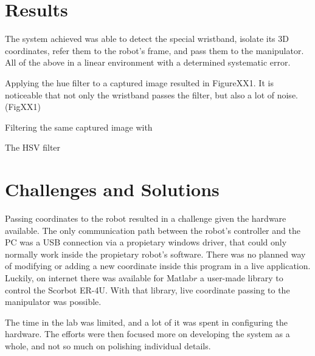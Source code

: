 \documentclass[12pt,a4paper,titlepage]{article}
\begin{document}
\section{Results}

The system achieved was able to detect the special wristband, isolate its 3D coordinates, refer them to the robot's frame, and pass them to the manipulator. All of the above in a linear environment with a determined systematic error.

Applying the hue filter to a captured image resulted in FigureXX1. It is noticeable that not only the wristband passes the filter, but also a lot of noise.
(FigXX1)

Filtering the same captured image with 


The HSV filter


\section{Challenges and Solutions}

Passing coordinates to the robot resulted in a challenge given the hardware available. The only communication path between the robot's controller and the PC was a USB connection via a propietary windows driver, that could only normally work inside the propietary robot's software. There was no planned way of modifying or adding a new coordinate inside this program in a live application. Luckily, on internet there was available for Matlab$r$ a user-made library to control the Scorbot ER-4U. With that library, live coordinate passing to the manipulator was possible.

The time in the lab was limited, and a lot of it was spent in configuring the hardware. The efforts were then focused more on developing the system as a whole, and not so much on polishing individual details.
\end{document}
